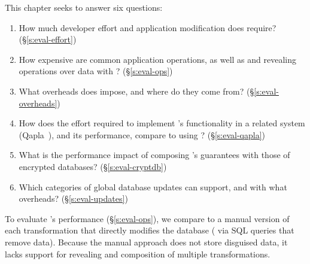 This chapter seeks to answer six questions:
%
\begin{enumerate}[nosep]
 \item How much developer effort and application modification does \sys require? (\S\ref{s:eval-effort})
%
\item How expensive are common application operations, as well as
  \xxing and revealing operations over \xxed data with \sys? (\S\ref{s:eval-ops})

\item What overheads does \sys impose, and where do they come from?
    (\S\ref{s:eval-overheads})

\item 
    How does the effort required to implement \sys's
    functionality in a related system (Qapla~\cite{qapla}),
    and its performance, compare to using \sys?
    (\S\ref{s:eval-qapla})

\item 
    What is the performance impact of composing \sys's guarantees
    with those of encrypted databases?
        (\S\ref{s:eval-cryptdb})

\item 
    Which categories of global database updates can \sys
        support, and with what overheads? (\S\ref{s:eval-updates})
%
\end{enumerate}

To evaluate \sys's performance (\S\ref{s:eval-ops}), we compare \sys to a manual
version of each \xxing transformation that directly modifies the database (\eg
via SQL queries that remove data). Because the manual approach does not store
disguised data, it lacks support for revealing and
composition of multiple transformations. 

%

%
%
%
%

